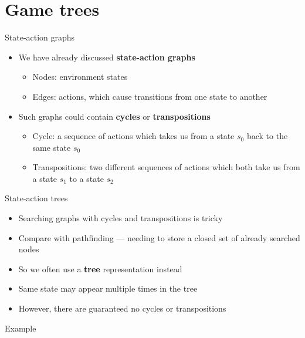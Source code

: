 \part{Game trees}
\frame{\partpage}

\begin{frame}{State-action graphs}
    \begin{itemize}
        \pause\item We have already discussed \textbf{state-action graphs}
        \begin{itemize}
            \pause\item Nodes: environment states
            \pause\item Edges: actions, which cause transitions from one state to another
        \end{itemize}
        \pause\item Such graphs could contain \textbf{cycles} or \textbf{transpositions}
        \begin{itemize}
            \pause\item Cycle: a sequence of actions which takes us from a state $s_0$ back to the same state $s_0$
            \pause\item Transpositions: two different sequences of actions which both take us from a state $s_1$
                to a state $s_2$
        \end{itemize}
        
    \end{itemize}
\end{frame}

\begin{frame}{State-action trees}
    \begin{itemize}
        \pause\item Searching graphs with cycles and transpositions is tricky
        \pause\item Compare with pathfinding --- needing to store a closed set of already searched nodes
        \pause\item So we often use a \textbf{tree} representation instead
        \pause\item Same state may appear multiple times in the tree
        \pause\item However, there are guaranteed no cycles or transpositions
    \end{itemize}
\end{frame}

\begin{frame}{Example}
	\centering
\end{frame}

